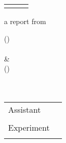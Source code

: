 \begin{titlepage}
	\begin{tabular}{l p{9.0cm} r}
		 &  &
		\end{tabular}
		\begin{center}
		
		\vspace{2.5cm}
		\fontsize{17.28pt}{30}
		\textbf{\Title}
		\vspace{1.5cm}
		
		\fontsize{14pt}{30}
		\vspace{1.5cm}
		
		a report from
		
		\vspace{0.5cm}
		\textbf{\Authora} \hspace{1.0cm} (\IDa) \\
		\eMaila \\
		
		\vspace{0.5cm}
		 \& \\
		
		\vspace{0.5cm}
		\textbf{\Authorb} \hspace{1.0cm} (\IDb) \\
		\eMailb \\
		
		\vspace{1.5cm}
		\textbf{\Group}\\
		
	\end{center}
	\vfill
	\normalsize
	\begin{tabular}{ll}
		Assistant				&	\Assistant \\ \\
		Experiment			&	\Date 	\\ \\
	\end{tabular}
\end{titlepage}
